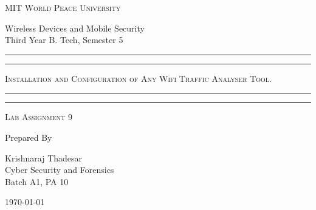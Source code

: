\documentclass[11pt]{article}
\begin{document}
\begin{titlepage}
    \centering


    \huge\textsc{
        MIT World Peace University
    }\\

    \vspace{0.75\baselineskip} %

    \LARGE{
        Wireless Devices and Mobile Security\\
        Third Year B. Tech, Semester 5
    }

    \vfill %


    \rule{\textwidth}{1.6pt}\vspace*{-\baselineskip}\vspace*{2pt}
    \rule{\textwidth}{0.6pt}
    \vspace{0.75\baselineskip} %



    \huge{\textsc{
            Installation and Configuration of Any Wifi Traffic Analyser Tool. 
        }} \\



    \vspace{0.5\baselineskip} %
    \rule{\textwidth}{0.6pt}\vspace*{-\baselineskip}\vspace*{2.8pt}
    \rule{\textwidth}{1.6pt}

    \vspace{1\baselineskip} %


    \LARGE\textsc{
        Lab Assignment 9
    } %
    \vfill


    Prepared By
    \vspace{0.5\baselineskip} %

    \Large{
        Krishnaraj Thadesar \\
        Cyber Security and Forensics\\
        Batch A1, PA 10
    }


    \vspace{0.5\baselineskip} %
    \today

\end{titlepage}
\end{document}
